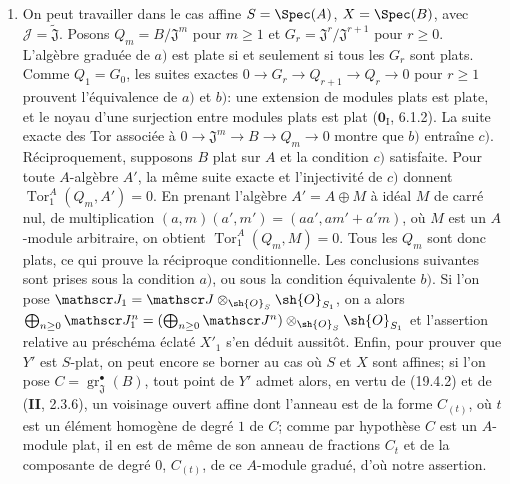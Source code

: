 \begin{enumerate}
  \item[(i)] On peut travailler dans le cas affine $S=\Spec(A)$, $X=\Spec(B)$, avec $\mathscr J=\widetilde{\mathfrak J}$. Posons $Q_m=B/\mathfrak J^m$ pour $m\geq1$ et $G_r=\mathfrak J^r/\mathfrak J^{r+1}$ pour $r\geq0$. L'algèbre graduée de $a)$ est plate si et seulement si tous les $G_r$ sont plats. Comme $Q_1=G_0$, les suites exactes $0\to G_r\to Q_{r+1}\to Q_r\to0$ pour $r\geq1$ prouvent l'équivalence de $a)$ et $b)$: une extension de modules plats est plate, et le noyau d'une surjection entre modules plats est plat ($\mathbf{0}_{\mathrm I}$, 6.1.2). La suite exacte des Tor associée à $0\to\mathfrak J^m\to B\to Q_m\to0$ montre que $b)$ entraîne $c)$. Réciproquement, supposons $B$ plat sur $A$ et la condition $c)$ satisfaite. Pour toute $A$-algèbre $A'$, la même suite exacte et l'injectivité de $c)$ donnent $\operatorname{Tor}_1^A(Q_m,A')=0$. En prenant l'algèbre $A'=A\oplus M$ à idéal $M$ de carré nul, de multiplication $(a,m)(a',m')=(aa',am'+a'm)$, où $M$ est un $A$-module arbitraire, on obtient $\operatorname{Tor}_1^A(Q_m,M)=0$. Tous les $Q_m$ sont donc plats, ce qui prouve la réciproque conditionnelle. Les conclusions suivantes sont prises sous la condition $a)$, ou sous la condition équivalente $b)$. Si l'on pose $\mathscr J_1=\mathscr J\otimes_{\sh{O}_S}\sh{O}_{S_1}$, on a alors $\bigoplus_{n\geq0}\mathscr J_1^n=(\bigoplus_{n\geq0}\mathscr J^n)\otimes_{\sh{O}_S}\sh{O}_{S_1}$ et l'assertion relative au préschéma éclaté $X'_1$ s'en déduit aussitôt. Enfin, pour prouver que $Y'$ est $S$-plat, on peut encore se borner au cas où $S$ et $X$ sont affines; si l'on pose $C=\operatorname{gr}_{\mathfrak J}^\bullet(B)$, tout point de $Y'$ admet alors, en vertu de (19.4.2) et de (\textbf{II}, 2.3.6), un
voisinage ouvert affine dont l'anneau est de la forme $C_{(t)}$, où $t$ est un élément homogène de degré $1$ de $C$; comme par hypothèse $C$ est un $A$-module plat, il en est de même de son anneau de fractions $C_t$ et de la composante de degré $0$, $C_{(t)}$, de ce $A$-module gradué, d'où notre assertion.

\end{enumerate}
